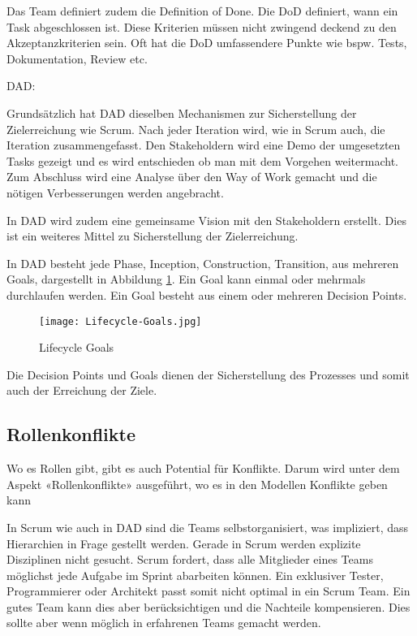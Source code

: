 Das Team definiert zudem die Definition of Done. Die DoD definiert, wann ein Task abgeschlossen ist. Diese Kriterien müssen nicht zwingend deckend zu den Akzeptanzkriterien sein. Oft hat die DoD umfassendere Punkte wie bspw. Tests, Dokumentation, Review etc.

\medskip

\pagebreak
{\Large DAD:}\cite{processGoals} \medskip

Grundsätzlich hat DAD dieselben Mechanismen zur Sicherstellung der Zielerreichung wie Scrum. Nach jeder Iteration wird, wie in Scrum auch, die Iteration zusammengefasst. Den Stakeholdern wird eine Demo der umgesetzten Tasks gezeigt und es wird entschieden ob man mit dem Vorgehen weitermacht. Zum Abschluss wird eine Analyse über den Way of Work gemacht und die nötigen Verbesserungen werden angebracht.

In DAD wird zudem eine gemeinsame Vision mit den Stakeholdern erstellt. Dies ist ein weiteres Mittel zu Sicherstellung der Zielerreichung.

In DAD besteht jede Phase, Inception, Construction, Transition, aus mehreren Goals, dargestellt in Abbildung \ref{fig:goals}. Ein Goal kann einmal oder mehrmals durchlaufen werden. Ein Goal besteht aus einem oder mehreren Decision Points.

\begin{figure}[H]
	\centering
	\texttt{[image: Lifecycle-Goals.jpg]}
	\caption{Lifecycle Goals \cite{processGoals}}
	\label{fig:goals}
\end{figure}

Die Decision Points und Goals dienen der Sicherstellung des Prozesses und somit auch der Erreichung der Ziele.

\subsection{Rollenkonflikte}

Wo es Rollen gibt, gibt es auch Potential für Konflikte. Darum wird unter dem Aspekt «Rollenkonflikte» ausgeführt, wo es in den Modellen Konflikte geben kann \cite{rollenKonflikte}

In Scrum wie auch in DAD sind die Teams selbstorganisiert, was impliziert, dass Hierarchien in Frage gestellt werden. Gerade in Scrum werden explizite Disziplinen nicht gesucht. Scrum fordert, dass alle Mitglieder eines Teams möglichst jede Aufgabe im Sprint abarbeiten können. Ein exklusiver Tester, Programmierer oder Architekt passt somit nicht optimal in ein Scrum Team. Ein gutes Team kann dies aber berücksichtigen und die Nachteile kompensieren. Dies sollte aber wenn möglich in erfahrenen Teams gemacht werden.

